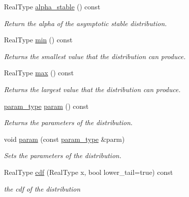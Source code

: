 \begin{DoxyCompactItemize}
\mbox{\label{classpareto__distribution_a6b9aed9573f877b6d7e84c109f443a40}} 
Real\+Type \mbox{\hyperlink{classpareto__distribution_a6b9aed9573f877b6d7e84c109f443a40}{alpha\+\_\+stable}} () const
\begin{DoxyCompactList}\small\item\em Return the alpha of the asymptotic stable distribution. \end{DoxyCompactList}\item 
Real\+Type \mbox{\hyperlink{classpareto__distribution_a73ccdc7f9a3f3131d58627a94789ecfb}{min}} () const
\begin{DoxyCompactList}\small\item\em Returns the smallest value that the distribution can produce. \end{DoxyCompactList}\item 
Real\+Type \mbox{\hyperlink{classpareto__distribution_a884ff35d4c1d1b5979e17c8eee41f397}{max}} () const
\begin{DoxyCompactList}\small\item\em Returns the largest value that the distribution can produce. \end{DoxyCompactList}\item 
\mbox{\hyperlink{classpareto__distribution_1_1param__type}{param\+\_\+type}} \mbox{\hyperlink{classpareto__distribution_ae56d30e604eb00dd286f99cdf6764bda}{param}} () const
\begin{DoxyCompactList}\small\item\em Returns the parameters of the distribution. \end{DoxyCompactList}\item 
void \mbox{\hyperlink{classpareto__distribution_aea6ab161e197e7350f5477492d00fe59}{param}} (const \mbox{\hyperlink{classpareto__distribution_1_1param__type}{param\+\_\+type}} \&parm)
\begin{DoxyCompactList}\small\item\em Sets the parameters of the distribution. \end{DoxyCompactList}\item 
\mbox{\label{classpareto__distribution_a6526c615f4ebcb26f1c88728d99db2d8}} 
Real\+Type \mbox{\hyperlink{classpareto__distribution_a6526c615f4ebcb26f1c88728d99db2d8}{cdf}} (Real\+Type x, bool lower\+\_\+tail=true) const
\begin{DoxyCompactList}\small\item\em the cdf of the distribution \end{DoxyCompactList}\item 

\end{DoxyCompactItemize}
